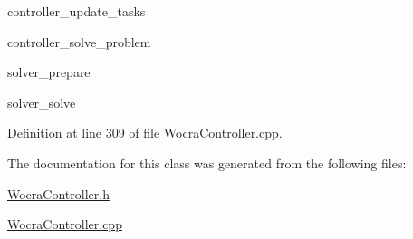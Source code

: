 \begin{DoxyItemize}
\item controller\+\_\+update\+\_\+tasks
\item controller\+\_\+solve\+\_\+problem
\item solver\+\_\+prepare
\item solver\+\_\+solve 
\end{DoxyItemize}

Definition at line 309 of file Wocra\+Controller.\+cpp.



The documentation for this class was generated from the following files\+:\begin{DoxyCompactItemize}
\item 
\hyperlink{WocraController_8h}{Wocra\+Controller.\+h}\item 
\hyperlink{WocraController_8cpp}{Wocra\+Controller.\+cpp}\end{DoxyCompactItemize}
